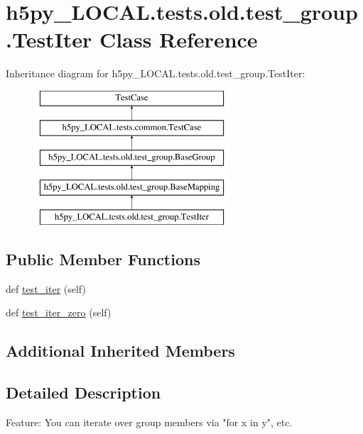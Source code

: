 \hypertarget{classh5py__LOCAL_1_1tests_1_1old_1_1test__group_1_1TestIter}{}\section{h5py\+\_\+\+L\+O\+C\+A\+L.\+tests.\+old.\+test\+\_\+group.\+Test\+Iter Class Reference}
\label{classh5py__LOCAL_1_1tests_1_1old_1_1test__group_1_1TestIter}
Inheritance diagram for h5py\+\_\+\+L\+O\+C\+A\+L.\+tests.\+old.\+test\+\_\+group.\+Test\+Iter\+:\begin{figure}[H]
\begin{center}
\leavevmode
\includegraphics[height=5.000000cm]{classh5py__LOCAL_1_1tests_1_1old_1_1test__group_1_1TestIter}
\end{center}
\end{figure}
\subsection*{Public Member Functions}
\begin{DoxyCompactItemize}
\item 
def \hyperlink{classh5py__LOCAL_1_1tests_1_1old_1_1test__group_1_1TestIter_a30d2400dbb9f9ed3af5811a3bd195252}{test\+\_\+iter} (self)
\item 
def \hyperlink{classh5py__LOCAL_1_1tests_1_1old_1_1test__group_1_1TestIter_ac3cb4ed2d65bacaedbe22026e3dbb0ac}{test\+\_\+iter\+\_\+zero} (self)
\end{DoxyCompactItemize}
\subsection*{Additional Inherited Members}


\subsection{Detailed Description}
\begin{DoxyVerb}    Feature: You can iterate over group members via "for x in y", etc.
\end{DoxyVerb}
 

